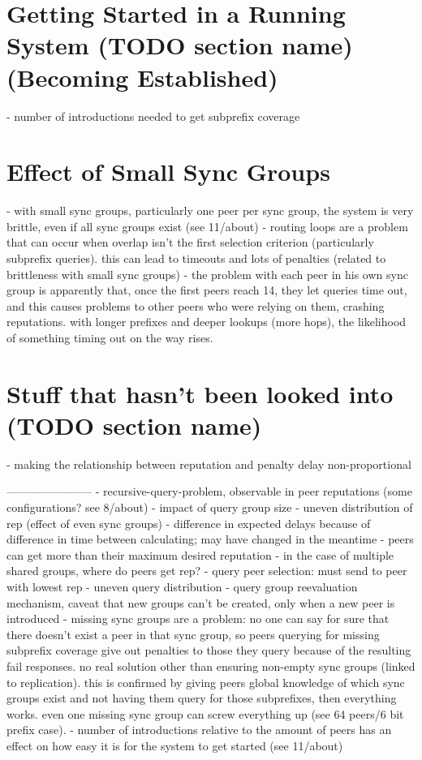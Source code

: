 \section{Getting Started in a Running System (TODO section name) (Becoming
Established)}
- number of introductions needed to get subprefix coverage

\section{Effect of Small Sync Groups}
- with small sync groups, particularly one peer per sync group, the system is
  very brittle, even if all sync groups exist (see 11/about)
- routing loops are a problem that can occur when overlap isn't the first
  selection criterion (particularly subprefix queries). this can lead to
  timeouts and lots of penalties (related to brittleness with small sync groups)
- the problem with each peer in his own sync group is apparently that, once the
  first peers reach 14, they let queries time out, and this causes problems to
  other peers who were relying on them, crashing reputations. with longer
  prefixes and deeper lookups (more hops), the likelihood of something timing
  out on the way rises.

\section{Stuff that hasn't been looked into (TODO section name)}
- making the relationship between reputation and penalty delay non-proportional


-----------------------
- recursive-query-problem, observable in peer reputations (some configurations?
  see 8/about)
- impact of query group size
- uneven distribution of rep (effect of even sync groups)
- difference in expected delays because of difference in time between
  calculating; may have changed in the meantime
- peers can get more than their maximum desired reputation
- in the case of multiple shared groups, where do peers get rep?
- query peer selection: must send to peer with lowest rep
- uneven query distribution
- query group reevaluation mechanism, caveat that new groups can't be created,
  only when a new peer is introduced
- missing sync groups are a problem: no one can say for sure that there doesn't
  exist a peer in that sync group, so peers querying for missing subprefix
  coverage give out penalties to those they query because of the resulting fail
  responses. no real solution other than ensuring non-empty sync groups (linked
  to replication). this is confirmed by giving peers global knowledge of which
  sync groups exist and not having them query for those subprefixes, then
  everything works. even one missing sync group can screw everything up (see 64
  peers/6 bit prefix case).
- number of introductions relative to the amount of peers has an effect on how
  easy it is for the system to get started (see 11/about)
